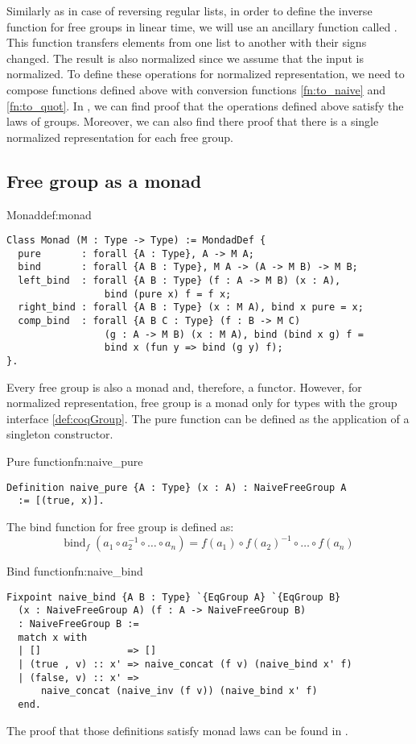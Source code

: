 Similarly as in case of reversing regular lists, in order to define the inverse function for free groups  in linear time, we will use an ancillary function called . This function transfers elements from one list to another with their signs changed. The result is also normalized since we assume that the input is normalized.
To define these operations for normalized representation, we need to compose functions defined above with conversion functions \ref{fn:to_naive} and \ref{fn:to_quot}. In , we can find proof that the operations defined above satisfy the laws of groups. Moreover, we can also find there proof that there is a single normalized representation for each free group.  
\subsection{Free group as a monad}
\begin{defi}{Monad}{def:monad}
\begin{verbatim}
Class Monad (M : Type -> Type) := MondadDef {
  pure       : forall {A : Type}, A -> M A;
  bind       : forall {A B : Type}, M A -> (A -> M B) -> M B;
  left_bind  : forall {A B : Type} (f : A -> M B) (x : A), 
                 bind (pure x) f = f x; 
  right_bind : forall {A B : Type} (x : M A), bind x pure = x; 
  comp_bind  : forall {A B C : Type} (f : B -> M C) 
                 (g : A -> M B) (x : M A), bind (bind x g) f = 
                 bind x (fun y => bind (g y) f);
}.
\end{verbatim}
\end{defi}
Every free group is also a monad and, therefore, a functor. However, for normalized representation, free group is a monad only for types with the group interface \ref{def:coqGroup}. The pure function can be defined as the application of a singleton constructor.
\begin{func}{Pure function}{fn:naive_pure}
\begin{verbatim}
Definition naive_pure {A : Type} (x : A) : NaiveFreeGroup A 
  := [(true, x)].
\end{verbatim}
\end{func}
The bind function for free group is defined as:
$$
    \textrm{bind}_f \; (a_1 \circ a_2^{-1} \circ \dots \circ a_n) = f (a_1) \circ f (a_2) ^{-1} \circ \dots \circ f (a_n)
$$
\begin{func}{Bind function}{fn:naive_bind}
\begin{verbatim}
Fixpoint naive_bind {A B : Type} `{EqGroup A} `{EqGroup B} 
  (x : NaiveFreeGroup A) (f : A -> NaiveFreeGroup B) 
  : NaiveFreeGroup B :=
  match x with
  | []               => []
  | (true , v) :: x' => naive_concat (f v) (naive_bind x' f)
  | (false, v) :: x' => 
      naive_concat (naive_inv (f v)) (naive_bind x' f)
  end.
\end{verbatim}
\end{func}
The proof that those definitions satisfy monad laws can be found in .

